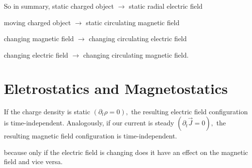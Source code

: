 So in summary, 
static charged object $\rightarrow$ static radial electric field

moving charged object $\rightarrow$ static circulating magnetic field

changing magnetic field $\rightarrow$ changing circulating electric field 

changing electric field $\rightarrow$ changing circulating magnetic field.

\section{Eletrostatics and Magnetostatics}
If the charge density is static $\left(\partial_{t} \rho=0\right),$ the resulting electric field configuration is time-independent. Analogously, if our current is steady $\left(\partial_{t} \vec{J}=0\right),$ the resulting magnetic field configuration is time-independent.

 because only if the electric field is changing does it have an effect on the magnetic field and vice versa.

